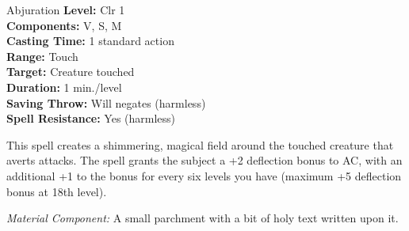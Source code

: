 {Abjuration}
{
	\textbf{Level:}
	Clr 1\\
	\textbf{Components:}
	V, S, M\\
	\textbf{Casting Time:}
	1 standard action\\
	\textbf{Range:}
	Touch\\
	\textbf{Target:}
	Creature touched\\
	\textbf{Duration:}
	1 min./level\\
	\textbf{Saving Throw:}
	Will negates (harmless)\\
	\textbf{Spell Resistance:}
	Yes (harmless)\\
}
{
	This spell creates a shimmering, magical field around the touched creature that averts attacks. The spell grants the subject a +2 deflection bonus to AC, with an additional +1 to the bonus for every six levels you have (maximum +5 deflection bonus at 18th level).

	\textit{Material Component:}
	A small parchment with a bit of holy text written upon it.

}
